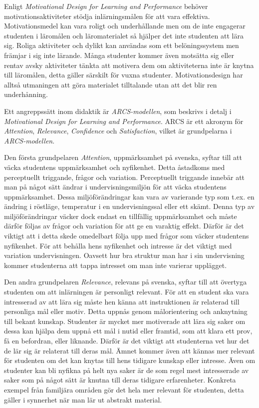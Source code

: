 \documentclass[]{article}
\begin{document}
Enligt \textit{Motivational Design for Learning and Performance} behöver
motivationsaktiviteter stödja inlärningsmålen för att vara effektiva.
Motivationsmedel kan vara roligt och underhållande men om de inte engagerar
studenten i läromålen och läromaterialet så hjälper det inte studenten att
lära sig. Roliga aktiviteter och dylikt kan användas som ett belöningssystem
men främjar i sig inte lärande. Många studenter kommer även motsätta sig
eller rentav avsky aktiviteter tänkta att motivera dem om aktiviteterna
inte är knytna till läromålen, detta gäller särskilt för vuxna studenter.
Motivationsdesign har alltså utmaningen att göra materialet tilltalande
utan att det blir ren underhånning.

Ett angreppssätt inom didaktik är \textit{ARCS-modellen},
som beskrivs i detalj i
\textit{Motivational Design for Learning and Performance}.
ARCS är ett akronym för \textit{Attention}, \textit{Relevance},
\textit{Confidence} och \textit{Satisfaction}, vilket är grundpelarna
i \textit{ARCS-modellen}.

Den första grundpelaren \textit{Attention}, uppmärksamhet på svenska,
syftar till att väcka studentens uppmärksamhet och nyfikenhet.
Detta åstadkoms med perceptuellt triggande, frågor och variation.
Perceptuellt triggande innebär att man på något sätt ändrar i
undervisningsmiljön för att väcka studentens uppmärksamhet.
Dessa miljöförändringar kan vara av varierande typ som t.ex. en ändring i
röstläge, temperatur i en undervisningssal eller ett skämt.
Denna typ av miljöförändringar väcker dock endast en tillfällig uppmärksamhet
och måste därför följas av frågor och variation för att ge en varaktig effekt.
Därför är det viktigt att i detta skede omedelbart följa upp med frågor som väcker
studentens nyfikenhet. För att behålla hens nyfikenhet och
intresse är det viktigt med variation undervisningen.
Oavsett hur bra struktur man har i sin undervisning kommer studenterna att tappa
intresset om man inte varierar upplägget.

Den andra grundpelaren \textit{Relevance}, relevans på svenska,
syftar till att övertyga studenten om att inlärningen är personligt relevant.
För att en student ska vara intresserad av att lära sig måste hen känna
att instruktionen är relaterad till personliga mål eller motiv.
Detta uppnås genom målorientering och anknytning till bekant kunskap.
Studenter är mycket mer motiverade att lära sig saker om dessa kan hjälpa dem
uppnå ett mål i nutid eller framtid, som att klara ett prov, få en befordran,
eller liknande. Därför är det viktigt att studenterna vet hur det de lär sig är
relaterat till deras mål. Ämnet kommer även att kännas mer relevant för studenten
om det kan knytas till hens tidigare kunskap eller intresse. Även om studenter kan
bli nyfikna på helt nya saker är de som regel mest intresserade av saker som på
något sätt är knutna till deras tidigare erfarenheter.
Konkreta exempel från familjära områden gör det hela mer relevant för studenten,
detta gäller i synnerhet när man lär ut abstrakt material.
\end{document}
